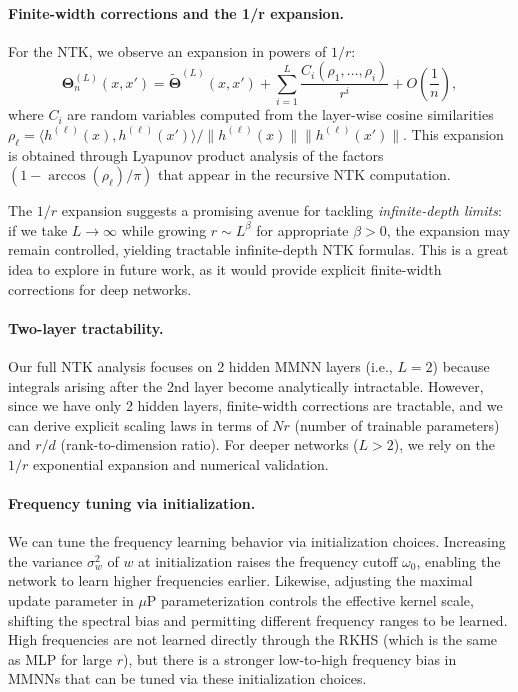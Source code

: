 \documentclass{article}
\newcommand{\Kop}{\boldsymbol{\Theta}}
\begin{document}
\paragraph{Finite-width corrections and the 1/r expansion.}
For the NTK, we observe an expansion in powers of \( 1/r \):
\[
\Kop^{(L)}_n(x,x') = \tilde{\Kop}^{(L)}(x,x') + \sum_{i=1}^{L} \frac{C_i(\rho_1, \dots, \rho_i)}{r^i} + O\!\left(\frac{1}{n}\right),
\]
where \( C_i \) are random variables computed from the layer-wise cosine similarities \( \rho_\ell = \langle h^{(\ell)}(x), h^{(\ell)}(x') \rangle / \|h^{(\ell)}(x)\| \|h^{(\ell)}(x')\| \). This expansion is obtained through Lyapunov product analysis of the factors \( (1 - \arccos(\rho_\ell)/\pi) \) that appear in the recursive NTK computation.

The \( 1/r \) expansion suggests a promising avenue for tackling \emph{infinite-depth limits}: if we take \( L \to \infty \) while growing \( r \sim L^\beta \) for appropriate \( \beta > 0 \), the expansion may remain controlled, yielding tractable infinite-depth NTK formulas. This is a great idea to explore in future work, as it would provide explicit finite-width corrections for deep networks.

\paragraph{Two-layer tractability.}
Our full NTK analysis focuses on 2 hidden MMNN layers (i.e., \( L = 2 \)) because integrals arising after the 2nd layer become analytically intractable. However, since we have only 2 hidden layers, finite-width corrections are tractable, and we can derive explicit scaling laws in terms of \( Nr \) (number of trainable parameters) and \( r/d \) (rank-to-dimension ratio). For deeper networks (\( L > 2 \)), we rely on the \( 1/r \) exponential expansion and numerical validation.

\paragraph{Frequency tuning via initialization.}
We can tune the frequency learning behavior via initialization choices. Increasing the variance \( \sigma_w^2 \) of \( w \) at initialization raises the frequency cutoff \( \omega_0 \), enabling the network to learn higher frequencies earlier. Likewise, adjusting the maximal update parameter in \( \mu \)P parameterization controls the effective kernel scale, shifting the spectral bias and permitting different frequency ranges to be learned.
High frequencies are not learned directly through the RKHS (which is the same as MLP for large \( r \)), but there is a stronger low-to-high frequency bias in MMNNs that can be tuned via these initialization choices.
\end{document}
